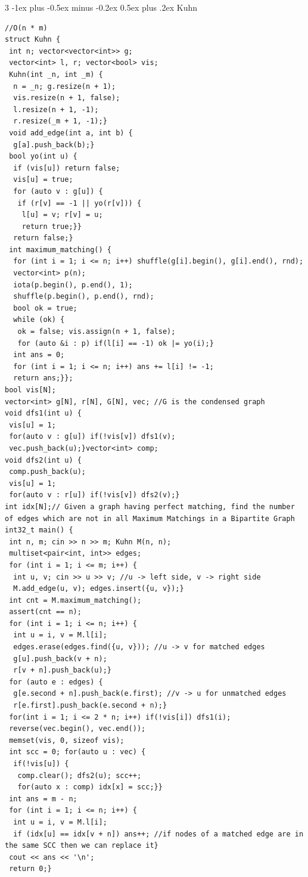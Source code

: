 \documentclass[8pt,a4paper,onesided]{article}
\makeatletter
\renewcommand{\subsection}{\@startsection{subsection}{2}{0mm}
    {-1ex plus -0.5ex minus -0.2ex} %
    {0.5ex plus .2ex}                %
    {\normalfont\large\bfseries}}    %
\makeatother
\begin{document}
\begin{multicols}{3}
\subsection{Kuhn}
\begin{verbatim}
//O(n * m) 
struct Kuhn {
 int n; vector<vector<int>> g;
 vector<int> l, r; vector<bool> vis;
 Kuhn(int _n, int _m) {
  n = _n; g.resize(n + 1);
  vis.resize(n + 1, false);
  l.resize(n + 1, -1);
  r.resize(_m + 1, -1);}
 void add_edge(int a, int b) {
  g[a].push_back(b);}
 bool yo(int u) {
  if (vis[u]) return false;
  vis[u] = true;
  for (auto v : g[u]) {
   if (r[v] == -1 || yo(r[v])) {
    l[u] = v; r[v] = u;
    return true;}}
  return false;}
 int maximum_matching() {
  for (int i = 1; i <= n; i++) shuffle(g[i].begin(), g[i].end(), rnd);
  vector<int> p(n);
  iota(p.begin(), p.end(), 1);
  shuffle(p.begin(), p.end(), rnd);
  bool ok = true;
  while (ok) {
   ok = false; vis.assign(n + 1, false);
   for (auto &i : p) if(l[i] == -1) ok |= yo(i);}
  int ans = 0;
  for (int i = 1; i <= n; i++) ans += l[i] != -1;
  return ans;}};
bool vis[N];
vector<int> g[N], r[N], G[N], vec; //G is the condensed graph
void dfs1(int u) {
 vis[u] = 1;
 for(auto v : g[u]) if(!vis[v]) dfs1(v);
 vec.push_back(u);}vector<int> comp;
void dfs2(int u) {
 comp.push_back(u);
 vis[u] = 1;
 for(auto v : r[u]) if(!vis[v]) dfs2(v);}
int idx[N];// Given a graph having perfect matching, find the number of edges which are not in all Maximum Matchings in a Bipartite Graph
int32_t main() {
 int n, m; cin >> n >> m; Kuhn M(n, n);
 multiset<pair<int, int>> edges;
 for (int i = 1; i <= m; i++) {
  int u, v; cin >> u >> v; //u -> left side, v -> right side
  M.add_edge(u, v); edges.insert({u, v});}
 int cnt = M.maximum_matching();
 assert(cnt == n);
 for (int i = 1; i <= n; i++) {
  int u = i, v = M.l[i];
  edges.erase(edges.find({u, v})); //u -> v for matched edges
  g[u].push_back(v + n);
  r[v + n].push_back(u);}
 for (auto e : edges) {
  g[e.second + n].push_back(e.first); //v -> u for unmatched edges
  r[e.first].push_back(e.second + n);}
 for(int i = 1; i <= 2 * n; i++) if(!vis[i]) dfs1(i);
 reverse(vec.begin(), vec.end());
 memset(vis, 0, sizeof vis);
 int scc = 0; for(auto u : vec) {
  if(!vis[u]) {
   comp.clear(); dfs2(u); scc++;
   for(auto x : comp) idx[x] = scc;}}
 int ans = m - n;
 for (int i = 1; i <= n; i++) {
  int u = i, v = M.l[i];
  if (idx[u] == idx[v + n]) ans++; //if nodes of a matched edge are in the same SCC then we can replace it}
 cout << ans << '\n';
 return 0;}
\end{verbatim}

\end{multicols}
\end{document}
